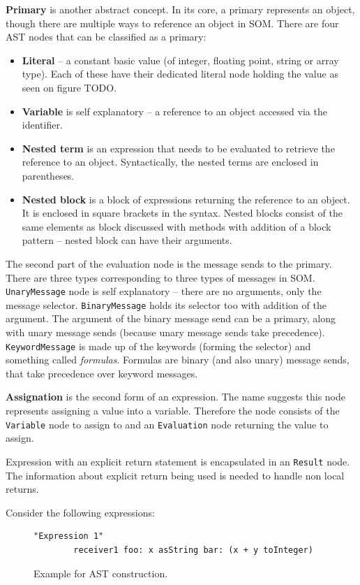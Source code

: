 \documentclass[thesis=M,english]{FITthesis}[2019/12/23]
\begin{document}
\textbf{Primary} is another abstract concept. In its core, a primary represents an object, though there are multiple ways to reference an object in SOM.
There are four AST nodes that can be classified as a primary:
\begin{itemize}
	\item \textbf{Literal} -- a constant basic value (of integer, floating point, string or array type). Each of these have their dedicated literal node
		holding the value as seen on figure TODO.
	\item \textbf{Variable} is self explanatory -- a reference to an object accessed via the identifier.
	\item \textbf{Nested term} is an expression that needs to be evaluated to retrieve the reference to an object. Syntactically, the nested terms
		are enclosed in parentheses.
	\item \textbf{Nested block} is a block of expressions returning the reference to an object. It is enclosed in square brackets in the syntax.
		Nested blocks consist of the same elements as block discussed with methods with addition of a block pattern -- nested block can have their arguments. %
\end{itemize}

The second part of the evaluation node is the message sends to the primary. There are three types corresponding to three types of messages in SOM.
\texttt{UnaryMessage} node is self explanatory -- there are no arguments, only the message selector. \texttt{BinaryMessage} holds its selector too
with addition of the argument. The argument of the binary message send can be a primary, along with unary message sends (because unary message sends take
precedence). \texttt{KeywordMessage} is made up of the keywords (forming the selector) and something called \textit{formulas}. Formulas are binary (and also unary) message
sends, that take precedence over keyword messages.

\textbf{Assignation} is the second form of an expression. The name suggests this node represents assigning a value into a variable. Therefore the node consists
of the \texttt{Variable} node to assign to and an \texttt{Evaluation} node returning the value to assign.

Expression with an explicit return statement is encapsulated in an \texttt{Result} node. The information about explicit return being used is needed
to handle non local returns.

Consider the following expressions:
\begin{figure}[h!]
	\centering
	\begin{lstlisting}[language=Smalltalk]
		"Expression 1"
		receiver1 foo: x asString bar: (x + y toInteger) 
	\end{lstlisting}
	\caption{Example for AST construction.}
	\label{fig:ast_constr_ex}
\end{figure}
\end{document}
